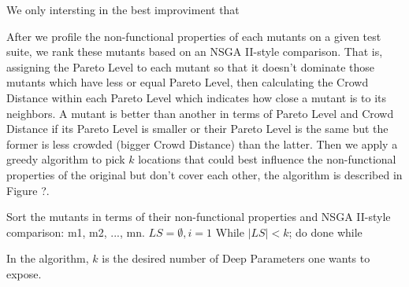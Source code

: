 We only intersting in the best improviment that

After we profile the non-functional properties of each mutants on a given test suite, we rank these mutants based on an NSGA II-style comparison. That is, assigning the Pareto Level to each mutant so that it doesn't dominate those mutants which have less or equal Pareto Level, then calculating the Crowd Distance within each Pareto Level which indicates how close a mutant is to its neighbors. A mutant is better than another in terms of Pareto Level and Crowd Distance if its Pareto Level is smaller or their Pareto Level is the same but the former is less crowded (bigger Crowd Distance) than the latter. Then we apply a greedy algorithm to pick $k$ locations that could best influence the non-functional properties of the original but don't cover each other, the algorithm is described in Figure ?.

Sort the mutants in terms of their non-functional properties and NSGA II-style comparison: m1, m2, ..., mn.
$LS=\emptyset, i=1$
While $|LS|<k$; do
done while

In the algorithm, $k$ is the desired number of Deep Parameters one wants to expose. 
